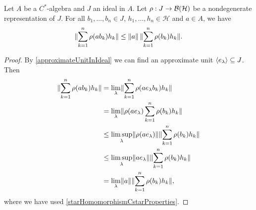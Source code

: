 \begin{lemma} \label{idealRepresentationExtensionLemma}
Let $A$ be a $C^*$-algebra and $J$ an ideal in $A$. Let $\rho: J\to \operatorname{\mathcal{B}}(\mathcal{H})$ be a nondegenerate representation of $J$. For all $b_1,\ldots, b_n\in J$, $h_1,\ldots, h_n\in\mathcal{H}$ and $a\in A$, we have
\[ \lVert\sum_{k=1}^n\rho(ab_k)h_k\rVert \leq \lVert a\rVert\, \lVert\sum_{k=1}^n\rho(b_k)h_k\rVert. \]
\end{lemma}
\begin{proof}
By \ref{approximateUnitInIdeal} we can find an approximate unit $\left\langle e_\lambda \right\rangle \subseteq J$. Then
\begin{align*}
\lVert\sum_{k=1}^n\rho(ab_k)h_k\rVert &= \lim_\lambda\lVert\sum_{k=1}^n\rho(ae_\lambda b_k)h_k\rVert \\
&= \lim_\lambda\lVert\rho(ae_\lambda)\sum_{k=1}^n\rho(b_k)h_k\rVert \\
&\leq \limsup_\lambda\lVert\rho(ae_\lambda)\rVert\lVert\sum_{k=1}^n\rho(b_k)h_k\rVert \\
&\leq \limsup_\lambda\lVert ae_\lambda\rVert\lVert\sum_{k=1}^n\rho(b_k)h_k\rVert \\
&= \lim_\lambda\lVert a\rVert\lVert\sum_{k=1}^n\rho(b_k)h_k\rVert,
\end{align*}
where we have used \ref{starHomomorphismCstarProperties}.
\end{proof}

